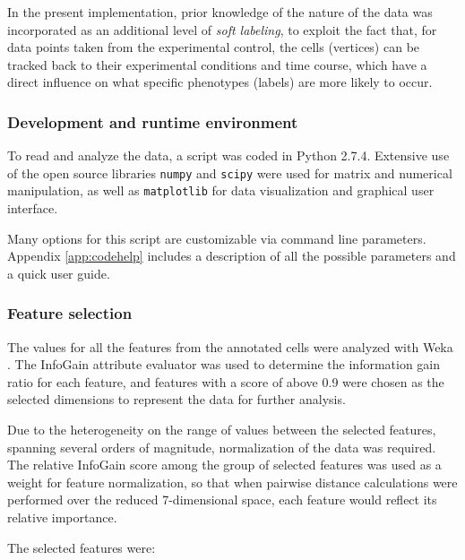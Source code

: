 \documentclass[oneside, a4paper, draft]{memoir} %
\begin{document}
In the present implementation, prior knowledge of the nature of the data was incorporated as an additional level of
\emph{soft labeling}, to exploit the fact that, for data points taken from the experimental control, the cells
(vertices) can be tracked back to their experimental conditions and time course, which have a direct influence on what
specific phenotypes (labels) are more likely to occur.

\subsubsection{Development and runtime environment}
To read and analyze the data, a script was coded in Python 2.7.4. Extensive use of the open source libraries
\texttt{numpy} and \texttt{scipy} were used for matrix and numerical manipulation, as well as \texttt{matplotlib} for
data visualization and graphical user interface.

Many options for this script are customizable via command line parameters. Appendix \ref{app:codehelp} includes a
description of all the possible parameters and a quick user guide.

\subsubsection{Feature selection}
The values for all the features from the annotated cells were analyzed with Weka \cite{hall2009weka}. The InfoGain
attribute evaluator was used to determine the information gain ratio for each feature, and features with a score of
above  0.9 were chosen as the selected dimensions to represent
the data for further analysis.

Due to the heterogeneity on the range of values between the selected features, spanning 
several orders of magnitude, normalization of the data was required. The relative
 InfoGain score among the group of
selected features was used as a weight for feature normalization, so that when pairwise distance calculations were 
performed over the reduced 7-dimensional space, each feature would reflect its relative importance.

The selected features were: 
\end{document}
